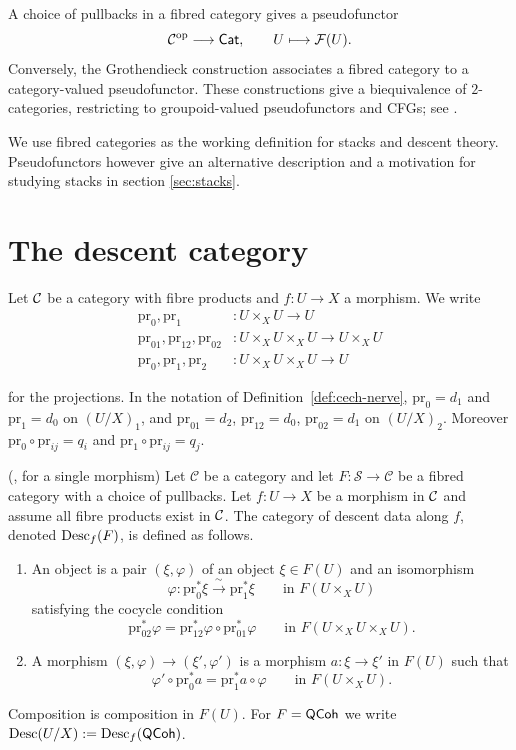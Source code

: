 \begin{remark}
	A choice of pullbacks in a fibred category gives a
	pseudofunctor
	\[
	\mathcal{C}^{\mathrm{op}}\longrightarrow\mathsf{Cat},
	\qquad U\longmapsto\mathcal{F}(U).
	\]
	Conversely, the Grothendieck construction associates
	a fibred category to a category-valued pseudofunctor.
	These constructions give a biequivalence of
	$2$-categories, restricting to groupoid-valued
	pseudofunctors and CFGs; see
	\cite[][Section~3.1.3]{vistoli2007notes}.
	
	We use fibred categories as the working definition for stacks and descent theory. Pseudofunctors however give an alternative description and a motivation for studying stacks in section \ref{sec:stacks}.
\end{remark}


\section{The descent category}

Let $\mathcal{C}$ be a category with fibre products and $f:U\to X$ a morphism. We write
\begin{align*}
	\mathrm{pr}_0,\mathrm{pr}_1 &:U\times_XU \to U \\
	\mathrm{pr}_{01},\mathrm{pr}_{12},\mathrm{pr}_{02} &:U\times_XU\times_XU \to U\times_XU \\
	\mathrm{pr}_0,\mathrm{pr}_1,\mathrm{pr}_2&:U\times_XU\times_XU \to U
\end{align*}

for the projections. In the notation of Definition~\ref{def:cech-nerve}, $\mathrm{pr}_0=d_1$ and $\mathrm{pr}_1=d_0$ on $(U/X)_1$, and $\mathrm{pr}_{01}=d_2$, $\mathrm{pr}_{12}=d_0$, $\mathrm{pr}_{02}=d_1$ on $(U/X)_2$. Moreover $\mathrm{pr}_0\circ\mathrm{pr}_{ij}=q_i$ and $\mathrm{pr}_1\circ\mathrm{pr}_{ij}=q_j$.

\begin{definition}\label{def:classical-descent-data}
	(\cite[][Definition~4.2]{vistoli2007notes}, for a single morphism)
	Let $\mathcal{C}$ be a category and let $F:\mathcal{S}\to\mathcal{C}$ be a fibred category with a choice of pullbacks. Let $f:U\to X$ be a morphism in $\mathcal{C}$ and assume all fibre products exist in $\mathcal{C}$. The category of descent data along $f$, denoted $\operatorname{Desc}_f(F)$, is defined as follows.
	\begin{enumerate}
		\item An object is a pair $(\xi,\varphi)$ of an object $\xi\in F(U)$ and an isomorphism
		\[
		\varphi:\mathrm{pr}_0^*\xi\xrightarrow{\ \sim\ }\mathrm{pr}_1^*\xi\qquad\text{in }F(U\times_XU)
		\]
		satisfying the cocycle condition
		\[
		\mathrm{pr}_{02}^*\varphi=\mathrm{pr}_{12}^*\varphi\circ\mathrm{pr}_{01}^*\varphi\qquad\text{in }F(U\times_XU\times_XU).
		\]
		\item A morphism $(\xi,\varphi)\to(\xi',\varphi')$ is a morphism $a:\xi\to\xi'$ in $F(U)$ such that
		\[
		\varphi'\circ\mathrm{pr}_0^*a=\mathrm{pr}_1^*a\circ\varphi\qquad\text{in }F(U\times_XU).
		\]
	\end{enumerate}
	Composition is composition in $F(U)$. For $F=\mathsf{QCoh}$ we write $\operatorname{Desc}(U/X):=\operatorname{Desc}_f(\mathsf{QCoh})$.
\end{definition}


